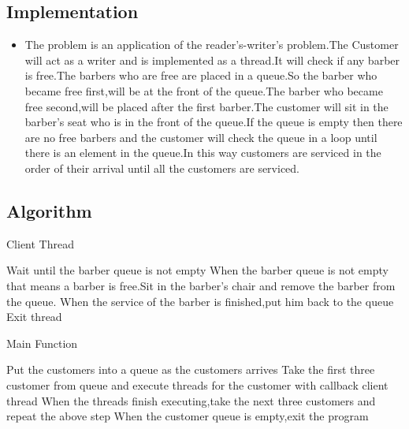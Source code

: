 \documentclass{article}
\begin{document}
    \subsection{Implementation}
        \begin{itemize}
         \item The problem is an application of the reader's-writer's problem.The Customer will act as a writer and is implemented as a thread.It will check if any barber is free.The barbers who are free are placed in a queue.So the barber who became free first,will be at the front of the queue.The barber who became free second,will be placed after the first barber.The customer will sit in the barber's seat who is in the front of the queue.If the queue is empty then there are no free barbers and the customer will check  the queue in a loop until there is an element in the queue.In this way customers are serviced in the order of their arrival until all the customers are serviced.
        \end{itemize}
    \subsection{Algorithm}
        \begin{algorithm}[H]
            \caption{Client Thread}
            \begin{algorithmic}
                \State Wait until the barber queue is not empty 
                \State When the barber queue is not empty that means a barber is free.Sit in the barber's chair and remove the barber from the queue.
                \State When the service of the barber is finished,put him back to the queue
                \State Exit thread

            \end{algorithmic}
            \end{algorithm}
         \begin{algorithm}[H]
            \caption{Main Function}
            \begin{algorithmic}
                \State Put the customers into a queue as the customers arrives
                \State Take the first three customer from queue and execute threads for the customer with callback client thread
                \State When the threads finish executing,take the next three customers and repeat the above step 
                \State When the customer queue is empty,exit the program
            \end{algorithmic}
            \end{algorithm}
\end{document}
